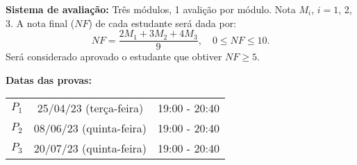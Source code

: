 \documentclass{beamer}
\begin{document}
    \begin{frame}
        {\bf{Sistema de avaliação:}} Três módulos, 1 avalição por módulo.
            Nota $M_i$, $i=1$, 2, 3. A nota final ($NF$) de cada estudante ser\'a dada por:
        \[
            NF = \dfrac{2M_1 + 3M_2 + 4M_3}{9}, \quad 0 \le NF \le 10.
        \]
        Ser\'a considerado aprovado o estudante que obtiver $NF \ge 5$.
    \end{frame}

    \begin{frame}
        {\bf Datas das provas:}
        \begin{center}
            \begin{tabular}{c|c|c}
                \hline\hline
                \hspace{0.5cm}{\bf Prova}\hspace{0.5cm} & \hspace{1cm}{\bf Data}\hspace{1cm} & \hspace{1cm}{\bf Hor\'{a}rio}\hspace{1cm} \\
                \hline\hline
                $P_1$ & 25/04/23 (terça-feira) & 19:00 - 20:40 \\
                \hline
                $P_2$ & 08/06/23 (quinta-feira) & 19:00 - 20:40 \\
                \hline
                $P_3$ & 20/07/23 (quinta-feira) & 19:00 - 20:40 \\
                \hline\hline
            \end{tabular}
        \end{center}
    \end{frame}
\end{document}
